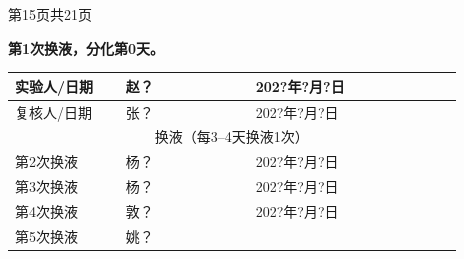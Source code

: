 \documentclass[UTF8,10pt,a4paper,fontset=fandol]{ctexart}
\newcommand{\fieldvalue}[1]{#1}
\newcommand{\handwritten}[1]{#1}
\begin{document}
\begin{center}
第15页\quad 共21页
\end{center}

\newpage

\begin{center}
\textbf{第1次换液，分化第0天。}
\end{center}

\begin{tabular}{|p{0.23\linewidth}|p{0.27\linewidth}|p{0.23\linewidth}|p{0.20\linewidth}|}
\hline
实验人/日期 &
\fieldvalue{\handwritten{赵？}} &
\fieldvalue{\handwritten{202?年?月?日}} &
\\ \hline
复核人/日期 &
\fieldvalue{\handwritten{张？}} &
\fieldvalue{\handwritten{202?年?月?日}} &
\\ \hline
\multicolumn{4}{|c|}{换液（每3--4天换液1次）}\\ \hline
第2次换液 &
\fieldvalue{\handwritten{杨？}} &
\fieldvalue{\handwritten{202?年?月?日}} &
\\ \hline
第3次换液 &
\fieldvalue{\handwritten{杨？}} &
\fieldvalue{\handwritten{202?年?月?日}} &
\\ \hline
第4次换液 &
\fieldvalue{\handwritten{敦？}} &
\fieldvalue{\handwritten{202?年?月?日}} &
\\ \hline
第5次换液 &
\fieldvalue{\handwritten{姚？}} &

\end{tabular}
\end{document}
